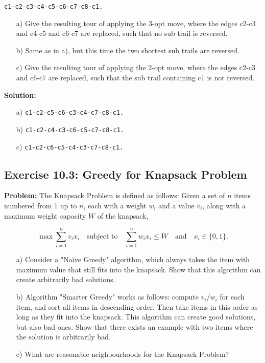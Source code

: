 \texttt{c1-c2-c3-c4-c5-c6-c7-c8-c1.}

\begin{enumerate}
\item[a)] Give the resulting tour of applying the 3-opt move, where the edges c2-c3 and c4-c5 and c6-c7 are replaced, such that no sub trail is reversed.
\item[b)] Same as in a), but this time the two shortest sub trails are reversed.
\item[c)] Give the resulting tour of applying the 2-opt move, where the edges c2-c3 and c6-c7 are replaced, such that the sub trail containing c1 is not reversed.
\end{enumerate}

\textbf{Solution:}
\begin{enumerate}
\item[a)] \texttt{c1-c2-c5-c6-c3-c4-c7-c8-c1.}
\item[b)] \texttt{c1-c2-c4-c3-c6-c5-c7-c8-c1.}
\item[c)] \texttt{c1-c2-c6-c5-c4-c3-c7-c8-c1.}
\end{enumerate}

\subsection{Exercise 10.3: Greedy for Knapsack Problem}
\textbf{Problem:}
The Knapsack Problem is defined as follows: Given a set of \(n\) items numbered from 1 up to \(n\), each with a weight \(w_i\) and a value \(v_i\), along with a maximum weight capacity \(W\) of the knapsack,

\[\max \sum_{i=1}^{n} v_i x_i \quad \text{subject to} \quad \sum_{i=1}^{n} w_i x_i \leq W \quad \text{and} \quad x_i \in \{0,1\}.\]

\begin{enumerate}
\item[a)] Consider a "Naïve Greedy" algorithm, which always takes the item with maximum value that still fits into the knapsack. Show that this algorithm can create arbitrarily bad solutions.
\item[b)] Algorithm "Smarter Greedy" works as follows: compute \(v_i/w_i\) for each item, and sort all items in descending order. Then take items in this order as long as they fit into the knapsack. This algorithm can create good solutions, but also bad ones. Show that there exists an example with two items where the solution is arbitrarily bad.
\item[c)] What are reasonable neighbourhoods for the Knapsack Problem?
\end{enumerate}

